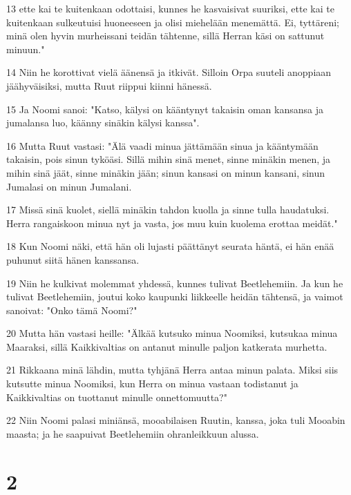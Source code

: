 \par 13 ette kai te kuitenkaan odottaisi, kunnes he kasvaisivat suuriksi, ette kai te kuitenkaan sulkeutuisi huoneeseen ja olisi miehelään menemättä. Ei, tyttäreni; minä olen hyvin murheissani teidän tähtenne, sillä Herran käsi on sattunut minuun."
\par 14 Niin he korottivat vielä äänensä ja itkivät. Silloin Orpa suuteli anoppiaan jäähyväisiksi, mutta Ruut riippui kiinni hänessä.
\par 15 Ja Noomi sanoi: "Katso, kälysi on kääntynyt takaisin oman kansansa ja jumalansa luo, käänny sinäkin kälysi kanssa".
\par 16 Mutta Ruut vastasi: "Älä vaadi minua jättämään sinua ja kääntymään takaisin, pois sinun tyköäsi. Sillä mihin sinä menet, sinne minäkin menen, ja mihin sinä jäät, sinne minäkin jään; sinun kansasi on minun kansani, sinun Jumalasi on minun Jumalani.
\par 17 Missä sinä kuolet, siellä minäkin tahdon kuolla ja sinne tulla haudatuksi. Herra rangaiskoon minua nyt ja vasta, jos muu kuin kuolema erottaa meidät."
\par 18 Kun Noomi näki, että hän oli lujasti päättänyt seurata häntä, ei hän enää puhunut siitä hänen kanssansa.
\par 19 Niin he kulkivat molemmat yhdessä, kunnes tulivat Beetlehemiin. Ja kun he tulivat Beetlehemiin, joutui koko kaupunki liikkeelle heidän tähtensä, ja vaimot sanoivat: "Onko tämä Noomi?"
\par 20 Mutta hän vastasi heille: "Älkää kutsuko minua Noomiksi, kutsukaa minua Maaraksi, sillä Kaikkivaltias on antanut minulle paljon katkerata murhetta.
\par 21 Rikkaana minä lähdin, mutta tyhjänä Herra antaa minun palata. Miksi siis kutsutte minua Noomiksi, kun Herra on minua vastaan todistanut ja Kaikkivaltias on tuottanut minulle onnettomuutta?"
\par 22 Niin Noomi palasi miniänsä, mooabilaisen Ruutin, kanssa, joka tuli Mooabin maasta; ja he saapuivat Beetlehemiin ohranleikkuun alussa.

\chapter{2}

